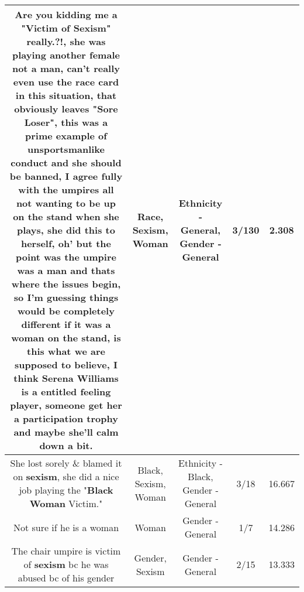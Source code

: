 \documentclass[11pt]{article}
\newlength\mylength
\begin{document}
\begin{center}
\begin{longtable}{|C{.65\mylength}|C{.30\mylength}|C{.12\mylength}|C{.12\mylength}|C{.12\mylength}|}
  \small Are you kidding me a "Victim of \textbf{Sexism}" really.?!, she was playing another female not a man, can't really even use the \textbf{race} card in this situation, that obviously leaves "Sore Loser", this was a prime example of unsportsmanlike conduct and she should be banned, I agree fully with the umpires all not wanting to be up on the stand when she plays, she did this to herself, oh' but the point was the umpire was a man and thats where the issues begin, so I'm guessing things would be completely different if it was a \textbf{woman} on the stand, is this what we are supposed to believe, I think Serena Williams is a entitled feeling player, someone get her a participation trophy and maybe she'll calm down a bit.\normalsize   & Race, Sexism, Woman & Ethnicity - General, Gender - General & 3/130 & 2.308 \\  \hline
  \small She lost sorely \& blamed it on \textbf{sexism}, she did a nice job playing the "\textbf{Black} \textbf{Woman} Victim."\normalsize   & Black, Sexism, Woman & Ethnicity - Black, Gender - General & 3/18 & 16.667 \\  \hline
  \small Not sure if he is a woman\normalsize   & Woman & Gender - General & 1/7 & 14.286 \\  \hline
  \small The chair umpire is victim of \textbf{sexism} bc he was abused bc of his gender\normalsize   & Gender, Sexism & Gender - General & 2/15 & 13.333 \\  \hline

\end{longtable}
\end{center}
\end{document}

